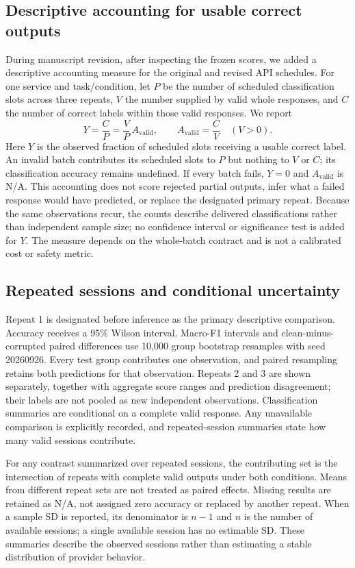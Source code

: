 \documentclass[11pt,a4paper]{article}
\begin{document}
\subsection{Descriptive accounting for usable correct outputs}
During manuscript revision, after inspecting the frozen scores, we added a descriptive accounting measure for the original and revised API schedules. For one service and task/condition, let $P$ be the number of scheduled classification slots across three repeats, $V$ the number supplied by valid whole responses, and $C$ the number of correct labels within those valid responses. We report
\begin{equation}
Y=\frac{C}{P}=\frac{V}{P}\,A_{\mathrm{valid}},\qquad A_{\mathrm{valid}}=\frac{C}{V}\quad(V>0).
\end{equation}
Here $Y$ is the observed fraction of scheduled slots receiving a usable correct label. An invalid batch contributes its scheduled slots to $P$ but nothing to $V$ or $C$; its classification accuracy remains undefined. If every batch fails, $Y=0$ and $A_{\mathrm{valid}}$ is N/A. This accounting does not score rejected partial outputs, infer what a failed response would have predicted, or replace the designated primary repeat. Because the same observations recur, the counts describe delivered classifications rather than independent sample size; no confidence interval or significance test is added for $Y$. The measure depends on the whole-batch contract and is not a calibrated cost or safety metric.

\subsection{Repeated sessions and conditional uncertainty}

Repeat 1 is designated before inference as the primary descriptive comparison. Accuracy receives a 95\% Wilson interval. Macro-F1 intervals and clean-minus-corrupted paired differences use 10,000 group bootstrap resamples with seed 20260926. Every test group contributes one observation, and paired resampling retains both predictions for that observation. Repeats 2 and 3 are shown separately, together with aggregate score ranges and prediction disagreement; their labels are not pooled as new independent observations. Classification summaries are conditional on a complete valid response. Any unavailable comparison is explicitly recorded, and repeated-session summaries state how many valid sessions contribute.

For any contrast summarized over repeated sessions, the contributing set is the intersection of repeats with complete valid outputs under both conditions. Means from different repeat sets are not treated as paired effects. Missing results are retained as N/A, not assigned zero accuracy or replaced by another repeat. When a sample SD is reported, its denominator is $n-1$ and $n$ is the number of available sessions; a single available session has no estimable SD. These summaries describe the observed sessions rather than estimating a stable distribution of provider behavior.
\end{document}
